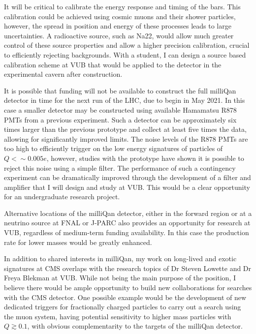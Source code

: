 \documentclass[11pt]{article}
\theoremstyle{plain} \numberwithin{equation}{section}
\theoremstyle{definition}
\begin{document}
It will be critical to calibrate the energy response and timing of the bars. 
This calibration could be achieved using cosmic muons and their shower particles, 
however, the spread in position and energy of these processes
leads to large uncertainties. A radioactive source, such as Na22, would allow much greater control 
of these source properties and allow a higher precision calibration, crucial to efficiently 
rejecting backgrounds. With a student, I can design a source based calibration scheme 
at VUB that would be applied to the detector in the experimental cavern after construction.

It is possible that funding will not be available to construct the full milliQan detector in
time for the next run of the LHC, due to begin in May 2021. In this case a smaller 
detector may be constructed using available Hamamatsu R878 PMTs from a previous experiment. 
Such a detector can be approximately six times
larger than the previous prototype and collect at least five times the data, allowing for
significantly improved limits. The noise levels of the R878 PMTs are too high to efficiently 
trigger on the low energy signatures of particles of $Q < \sim 0.005 e$, however, studies with the prototype
have shown it is possible to reject this noise using a simple filter. The performance of
such a contingency experiment can be dramatically improved through the development of a
filter and amplifier that I will design and study at VUB. This would be a clear opportunity 
for an undergraduate research project.

Alternative locations of the milliQan detector, either in the forward region or at a neutrino source 
at FNAL or J-PARC also provides an opportunity for research at VUB, 
regardless of medium-term funding availability. In this case the production rate 
for lower masses would be greatly enhanced.

In addition to shared interests in milliQan, my work on long-lived and exotic signatures
at CMS overlaps with the research topics of Dr Steven Lowette and Dr Freya Blekman at VUB. 
While not being the main purpose of the position, I believe there would be ample opportunity
to build new collaborations for searches with the CMS detector. One possible example
would be the development of new dedicated triggers for fractionally 
charged particles to carry out a search using the muon system, having potential
sensitivity to higher mass particles with $Q \gtrsim 0.1$, with obvious complementarity 
to the targets of the milliQan detector.
\end{document}
